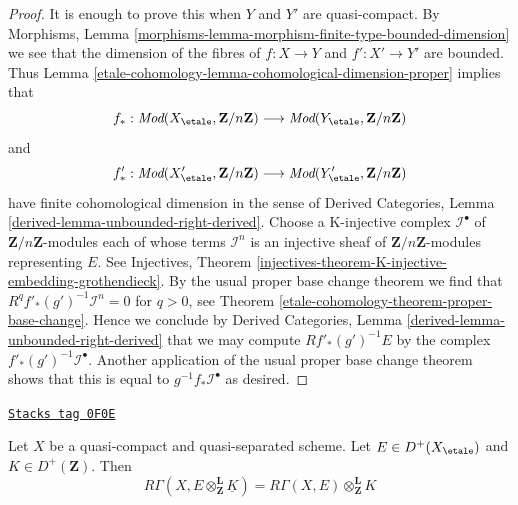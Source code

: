 \begin{proof}
It is enough to prove this when $Y$ and $Y'$ are quasi-compact.
By Morphisms, Lemma
\ref{morphisms-lemma-morphism-finite-type-bounded-dimension}
we see that the dimension of the fibres of
$f : X \to Y$ and $f' : X' \to Y'$ are bounded. Thus
Lemma \ref{etale-cohomology-lemma-cohomological-dimension-proper} implies that
$$
f_* :
\textit{Mod}(X_\etale, \mathbf{Z}/n\mathbf{Z})
\longrightarrow
\textit{Mod}(Y_\etale, \mathbf{Z}/n\mathbf{Z})
$$
and
$$
f'_* :
\textit{Mod}(X'_\etale, \mathbf{Z}/n\mathbf{Z})
\longrightarrow
\textit{Mod}(Y'_\etale, \mathbf{Z}/n\mathbf{Z})
$$
have finite cohomological dimension in the sense of
Derived Categories, Lemma \ref{derived-lemma-unbounded-right-derived}.
Choose a K-injective complex $\mathcal{I}^\bullet$
of $\mathbf{Z}/n\mathbf{Z}$-modules each of whose
terms $\mathcal{I}^n$ is an injective sheaf of
$\mathbf{Z}/n\mathbf{Z}$-modules representing $E$.
See Injectives, Theorem
\ref{injectives-theorem-K-injective-embedding-grothendieck}.
By the usual proper base change theorem we find
that $R^qf'_*(g')^{-1}\mathcal{I}^n = 0$ for $q > 0$, see
Theorem \ref{etale-cohomology-theorem-proper-base-change}.
Hence we conclude by
Derived Categories, Lemma \ref{derived-lemma-unbounded-right-derived}
that we may compute $Rf'_*(g')^{-1}E$ by the complex
$f'_*(g')^{-1}\mathcal{I}^\bullet$. Another application
of the usual proper base change theorem shows that
this is equal to $g^{-1}f_*\mathcal{I}^\bullet$ as desired.
\end{proof}

\begin{lemma}
\label{etale-cohomology-lemma-pull-out-constant}
\href{https://stacks.math.columbia.edu/tag/0F0E}{\texttt{Stacks tag 0F0E}}

Let $X$ be a quasi-compact and quasi-separated scheme.
Let $E \in D^+(X_\etale)$ and $K \in D^+(\mathbf{Z})$.
Then
$$
R\Gamma(X, E \otimes_\mathbf{Z}^\mathbf{L} \underline{K}) =
R\Gamma(X, E) \otimes_\mathbf{Z}^\mathbf{L} K
$$
\end{lemma}

